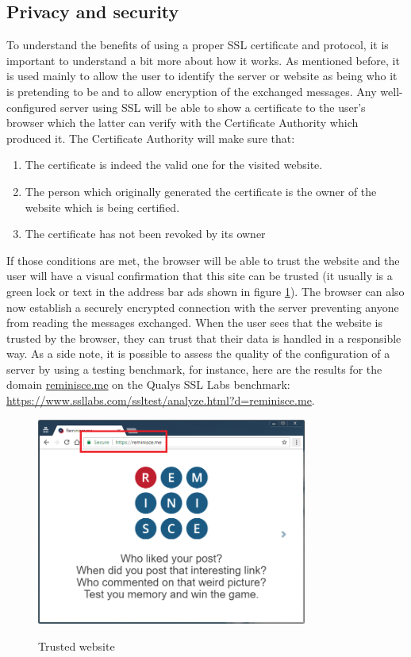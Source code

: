 \subsection{Privacy and security}\label{subsec:privacy}
To understand the benefits of using a proper SSL certificate and protocol, it is important to understand a bit more about how it works. As mentioned before, it is used mainly to allow the user to identify the server or website as being who it is pretending to be and to allow encryption of the exchanged messages. Any well-configured server using SSL will be able to show a certificate to the user's browser which the latter can verify with the Certificate Authority which produced it. The Certificate Authority will make sure that:
\begin{enumerate}
	\item The certificate is indeed the valid one for the visited website.
	\item The person which originally generated the certificate is the owner of the website which is being certified.
	\item The certificate has not been revoked by its owner
\end{enumerate}
If those conditions are met, the browser will be able to trust the website and the user will have a visual confirmation that this site can be trusted (it usually is a green lock or text in the address bar ads shown in figure \ref{fig:sslBar}). The browser can also now establish a securely encrypted connection with the server preventing anyone from reading the messages exchanged. When the user sees that the website is trusted by the browser, they can trust that their data is handled in a responsible way. As a side note, it is possible to assess the quality of the configuration of a server by using a testing benchmark, for instance, here are the results for the domain \url{reminisce.me} on the Qualys SSL Labs benchmark\cite{ssllabs}: \url{https://www.ssllabs.com/ssltest/analyze.html?d=reminisce.me}.
\begin{figure}
\centering
{\includegraphics[width=3.5in]{images/ssl_bar.png}}
\caption{Trusted website}
\label{fig:sslBar}
\end{figure}
